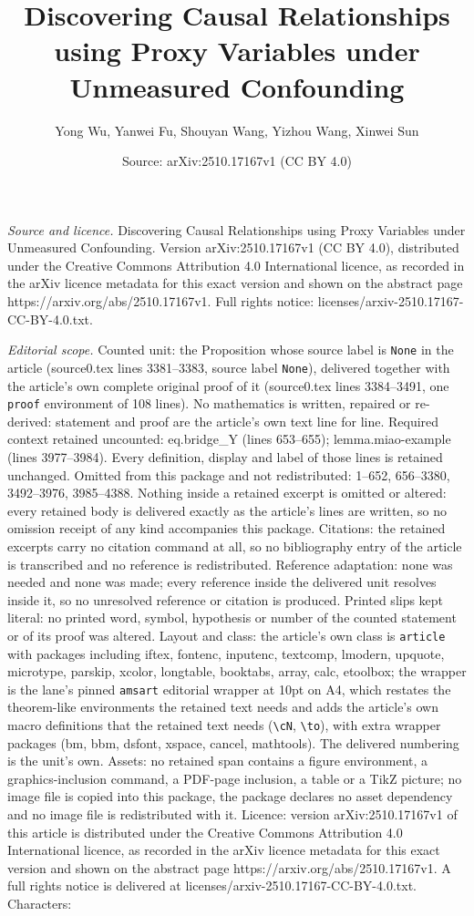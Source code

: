 \documentclass[10pt,a4paper]{amsart}
\title[Discovering Causal Relationships using Proxy Variables under]{Discovering Causal Relationships using Proxy Variables under Unmeasured Confounding}
\author{Yong Wu, Yanwei Fu, Shouyan Wang, Yizhou Wang, Xinwei Sun}
\date{Source: arXiv:2510.17167v1 (CC BY 4.0)}
\begin{document}
\maketitle

\noindent\emph{Source and licence.} Discovering Causal Relationships using Proxy Variables under Unmeasured Confounding. Version arXiv:2510.17167v1 (CC BY 4.0), distributed under the Creative Commons Attribution 4.0 International licence, as recorded in the arXiv licence metadata for this exact version and shown on the abstract page https://arxiv.org/abs/2510.17167v1. Full rights notice: licenses/arxiv-2510.17167-CC-BY-4.0.txt.\par\smallskip

\noindent\textit{Editorial scope.} Counted unit: the Proposition whose source label is \texttt{None} in the article (source0.tex lines 3381--3383, source label \texttt{None}), delivered together with the article's own complete original proof of it (source0.tex lines 3384--3491, one \texttt{proof} environment of 108 lines). No mathematics is written, repaired or re-derived: statement and proof are the article's own text line for line. Required context retained uncounted: eq.bridge\_Y (lines 653--655); lemma.miao-example (lines 3977--3984). Every definition, display and label of those lines is retained unchanged. Omitted from this package and not redistributed: 1--652, 656--3380, 3492--3976, 3985--4388. Nothing inside a retained excerpt is omitted or altered: every retained body is delivered exactly as the article's lines are written, so no omission receipt of any kind accompanies this package. Citations: the retained excerpts carry no citation command at all, so no bibliography entry of the article is transcribed and no reference is redistributed. Reference adaptation: none was needed and none was made; every reference inside the delivered unit resolves inside it, so no unresolved reference or citation is produced. Printed slips kept literal: no printed word, symbol, hypothesis or number of the counted statement or of its proof was altered. Layout and class: the article's own class is \texttt{article} with packages including iftex, fontenc, inputenc, textcomp, lmodern, upquote, microtype, parskip, xcolor, longtable, booktabs, array, calc, etoolbox; the wrapper is the lane's pinned \texttt{amsart} editorial wrapper at 10pt on A4, which restates the theorem-like environments the retained text needs and adds the article's own macro definitions that the retained text needs (\texttt{\textbackslash cN}, \texttt{\textbackslash to}), with extra wrapper packages (bm, bbm, dsfont, xspace, cancel, mathtools). The delivered numbering is the unit's own. Assets: no retained span contains a figure environment, a graphics-inclusion command, a PDF-page inclusion, a table or a TikZ picture; no image file is copied into this package, the package declares no asset dependency and no image file is redistributed with it. Licence: version arXiv:2510.17167v1 of this article is distributed under the Creative Commons Attribution 4.0 International licence, as recorded in the arXiv licence metadata for this exact version and shown on the abstract page https://arxiv.org/abs/2510.17167v1. A full rights notice is delivered at licenses/arxiv-2510.17167-CC-BY-4.0.txt. Characters: 
\end{document}
